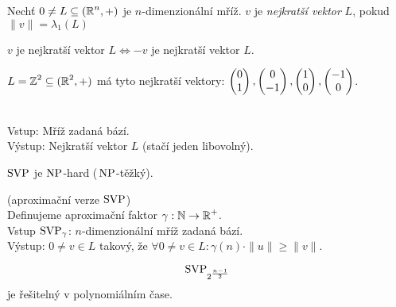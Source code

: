 \begin{definition} 
Nechť $0\neq L\subseteq(\operatorname{\mathbb{R}}^n,+)$ je $n$-dimenzionální mříž. $v$ je \emph{nejkratší vektor} $L$, pokud $\|v\|=\lambda_1(L)$
\end{definition}

\begin{note}
$v$ je nejkratší vektor $L\iff -v$ je nejkratší vektor $L$.
\end{note}

\begin{note}
$L=\operatorname{\mathbb{Z}}^2\subseteq(\operatorname{\mathbb{R}}^2,+)$ má tyto nejkratší vektory: $\begin{pmatrix} 0 \\ 1 \end{pmatrix},\begin{pmatrix} 0 \\ -1 \end{pmatrix},\begin{pmatrix} 1 \\ 0 \end{pmatrix},\begin{pmatrix} -1 \\ 0 \end{pmatrix}$.
\end{note}

\begin{definition}\phantom{}\\
Vstup: Mříž zadaná bází.\\
Výstup: Nejkratší vektor $L$ (stačí jeden libovolný).
\end{definition}

\begin{theorem}[M. Ajtai, 1998]
$\operatorname{SVP}$ je $\operatorname{NP}$-hard ($\,\operatorname{NP}$-těžký).
\end{theorem}

\begin{definition}[$\SVP_\gamma$]
(aproximační verze $\operatorname{SVP}$)\\
Definujeme aproximační faktor $\gamma:\operatorname{\mathbb{N}}\rightarrow\operatorname{\mathbb{R}}^+$.\\
Vstup $\SVP_\gamma$: $n$-dimenzionální mříž zadaná bází.\\
Výstup: $0\neq v\in L$ takový, že $\forall 0\neq v \in L: \gamma(n)\cdot\|u\|\geq\|v\|$.
\end{definition}

\begin{theorem}
$$\operatorname{SVP}_{2^\frac{n-1}{2}}$$ je řešitelný v polynomiálním čase.
\end{theorem}
